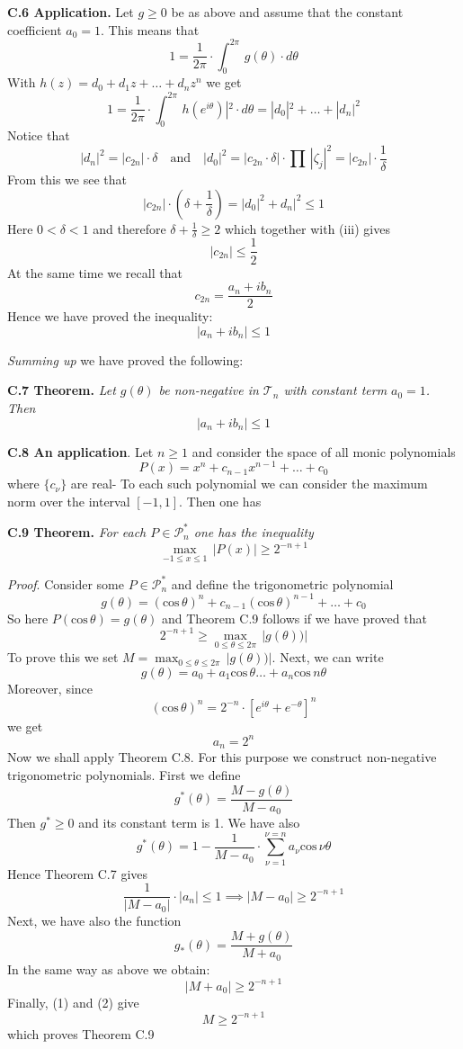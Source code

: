 \documentclass{amsart}
\begin{document}
{\noindent
{\bf C.6 Application.}
Let $g\geq 0$ be as above 
and assume that the constant coefficient $a_0=1$.
This means that
\[
1=\frac{1}{2\pi}\cdot 
\int_0^{2\pi}\, g(\theta)\cdot d\theta
\]
With
$h(z)=d_0+d_1z+\ldots+d_nz^n$
we get
\[
1 =\frac{1}{2\pi}\cdot 
\int_0^{2\pi}\,h(e^{i\theta})|^2\cdot d\theta
=|d_0|^2+\ldots+|d_n|^2
\]
Notice that
\[ |d_n|^2=|c_{2n}|\cdot\delta\quad\text{and}\quad
|d_0|^2= |c_{2n}\cdot \delta|\cdot\prod\,|\zeta_j|^2=|c_{2n}|\cdot \frac{1}{\delta}\tag{i}
\]
From this we see that
\[
|c_{2n}|\cdot(\delta+\frac{1}{\delta})= |d_0|^2+d_n|^2\leq 1\tag{iii}
\]
Here $0<\delta<1$ and therefore
$\delta+\frac{1}{\delta}\geq 2$ which together with
(iii) gives
\[
|c_{2n}|\leq \frac{1}{2}
\]
At the same time we recall  that
\[
c_{2n}=\frac{a_n+ib_n}{2}
\]
Hence we have proved the inequality:
\[
|a_n+ib_n|\leq 1\tag{*}
\]
\medskip

\noindent
\emph{Summing up} we have proved the following:
\medskip

\noindent
{\bf {C.7 Theorem.}}
\emph{Let $g(\theta)$
be non-negative in $\mathcal T_n$ with constant term
$a_0=1$. Then}
\[
|a_n+ib_n|\leq 1
\]


\noindent
{\bf {C.8 An application}}.
Let $n\geq 1$ and consider the space of all monic polynomials 
\[
P(x)=x^n+c_{n-1}x^{n-1}+\ldots+c_0
\]
where $\{c_\nu\}$ are real-
To each such polynomial we can consider the maximum norm
over the interval $[-1,1]$.
Then one has
\medskip

\noindent
{\bf {C.9 Theorem.}}
\emph{For each $P\in\mathcal P_n^*$ one has the inequality}
\[
\max_{-1\leq x\leq 1}\, |P(x)|\geq 2^{-n+1}
 \]
\medskip

\noindent
\emph{Proof}. 
Consider some $P\in\mathcal P_n^*$ and
define the trigonometric polynomial
\[ 
g(\theta)= (\text{cos}\,\theta)^n
+c_{n-1}(\text{cos}\,\theta)^{n-1}+\ldots+c_0
\]
So here
$P(\text{cos}\,\theta)= g(\theta)$ and 
Theorem C.9 follows if we have proved that
\[
2^{-n+1}\geq 
\max_{0\leq \theta\leq 2\pi}\, |g(\theta))|\tag{1}
\]
To prove this we set
$M=\max_{0\leq \theta\leq 2\pi}\, |g(\theta))|$.
Next, we can write
\[ 
g(\theta)= a_0+a_1\text{cos}\,\theta\ldots+
a_n\text{cos}\,n\theta
\]
Moreover, since
\[
(\text{cos}\,\theta)^n=2^{-n}\cdot[e^{i\theta}+e^{-\theta}]^n
\]
we get
\[ 
a_n=2^n
\]
Now we shall apply Theorem C.8. For this purpose we construct
non-negative trigonometric polynomials. First we define
\[
g^*(\theta)= \frac{M-g(\theta)}{M-a_0}
\]
Then $g^*\geq 0$ and its constant term is 1.
We have also
\[ 
g^*(\theta)= 1-\frac{1}{M-a_0}\cdot \sum_{\nu=1}^{\nu=n}a_\nu\text{cos}\,\nu\theta
\]
Hence Theorem C.7 gives
\[
\frac{1}{|M-a_0|}\cdot |a_n|\leq 1\implies
|M-a_0|\geq 2^{-n+1}\tag{1}
\]
Next, we have also the function
\[
g_*(\theta)= \frac{M+g(\theta)}{M+a_0}
\]
In the same way as above we obtain:
\[ 
|M+a_0|\geq 2^{-n+1}\tag{2}
\]
Finally, (1) and (2) give
\[
M\geq 2^{-n+1}
\]
which proves Theorem C.9
\bigskip

}
\end{document}
